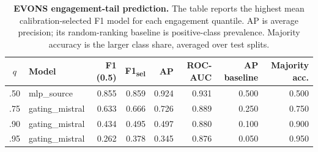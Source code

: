 \begin{table}[!ht]
\centering
\caption{{\bf EVONS engagement-tail prediction.} The table reports the highest mean calibration-selected F1 model for each engagement quantile. AP is average precision; its random-ranking baseline is positive-class prevalence. Majority accuracy is the larger class share, averaged over test splits.}
\label{tab:evons-virality}
\footnotesize
\begin{tabular}{clrrrrrr}
\toprule
$q$ & Model & F1 (0.5) & F1\textsubscript{sel} & AP & ROC-AUC & AP baseline & Majority acc. \\
\midrule
.50 & mlp\_source & 0.855 & 0.859 & 0.924 & 0.931 & 0.500 & 0.500 \\
.75 & gating\_mistral & 0.633 & 0.666 & 0.726 & 0.889 & 0.250 & 0.750 \\
.90 & gating\_mistral & 0.434 & 0.495 & 0.497 & 0.880 & 0.100 & 0.900 \\
.95 & gating\_mistral & 0.262 & 0.378 & 0.345 & 0.876 & 0.050 & 0.950 \\
\bottomrule
\end{tabular}
\end{table}
